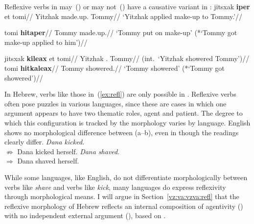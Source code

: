 Reflexive verbs in {\thit} may~(\nextx) or may not~(\anextx) have a causative variant in {\tpie}:
\pex\label{ex:vz:refl-va}
	\a \begingl
		\gla jitsxak \textbf{iper} et tomi//
		\glb Yitzhak made.up.  Tommy//
		\glft `Yitzhak applied make-up to Tommy.'//
	\endgl
	
	\a \begingl
		\gla tomi \textbf{hitaper}//
		\glb Tommy made.up.//
		\glft `Tommy put on make-up' (*`Tommy got make-up applied to him')//
	\endgl
\xe

\pex\label{ex:vz:refl-va2}
	\a \ljudge{*} \begingl
		\gla jitsxak \textbf{kileax} et tomi//
		\glb Yitzhak .  Tommy//
		\glft (int.~`Yitzhak showered Tommy')//
	\endgl
	\a \begingl
		\gla tomi \textbf{hitkaleax}//
		\glb Tommy showered.//
		\glft `Tommy showered' (*`Tommy got showered')//
	\endgl
\xe

In Hebrew, verbs like those in~(\ref{ex:refl}) are only possible in {\thit}. Reflexive verbs often pose puzzles in various languages, since these are cases in which one argument appears to have two thematic roles, agent and patient. The degree to which this configuration is tracked by the morphology varies by language. English shows no morphological difference between (\nextx a--b), even in though the readings clearly differ.
\pex \a \emph{Dana kicked.}\\
		$\nRightarrow$ Dana kicked herself.
	\a \emph{Dana shaved}.\\
		$\Rightarrow$ Dana shaved herself.
\xe

While some languages, like English, do not differentiate morphologically between verbs like \emph{shave} and verbs like \emph{kick}, many languages do express reflexivity through morphological means. I will argue in Section~\ref{vz:va:vzva:refl} that the reflexive morphology of Hebrew reflects an internal composition of agentivity (\va) with no independent external argument (\vz), based on \cite{kastner17gjgl}.

